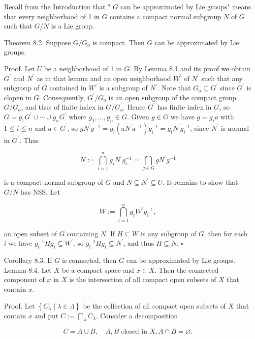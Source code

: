 \documentclass[10pt]{article}
\begin{document}
Recall from the Introduction that " $G$ can be approximated by Lie groups" means that every neighborhood of 1 in $G$ contains a compact normal subgroup $N$ of $G$ such that $G / N$ is a Lie group.

Theorem 8.2. Suppose $G / G_{\mathrm{o}}$ is compact. Then $G$ can be approximated by Lie groups.

Proof. Let $U$ be a neighborhood of 1 in $G$. By Lemma 8.1 and its proof we obtain $G^{\prime}$ and $N^{\prime}$ as in that lemma and an open neighborhood $W^{\prime}$ of $N^{\prime}$ such that any subgroup of $G$ contained in $W^{\prime}$ is a subgroup of $N^{\prime}$. Note that $G_{\mathrm{o}} \subseteq G^{\prime}$ since $G^{\prime}$ is clopen in $G$. Consequently, $G^{\prime} / G_{\mathrm{o}}$ is an open subgroup of the compact group $G / G_{\mathrm{o}}$, and thus of finite index in $G / G_{\mathrm{o}}$. Hence $G^{\prime}$ has finite index in $G$, so $G=g_{1} G^{\prime} \cup \cdots \cup g_{n} G^{\prime}$ where $g_{1}, \ldots, g_{n} \in G$. Given $g \in G$ we have $g=g_{i} a$ with $1 \leq i \leq n$ and $a \in G^{\prime}$, so $g N^{\prime} g^{-1}=g_{i}\left(a N^{\prime} a^{-1}\right) g_{i}^{-1}=g_{i} N^{\prime} g_{i}^{-1}$, since $N^{\prime}$ is normal in $G^{\prime}$. Thus

$$
N:=\bigcap_{i=1}^{n} g_{i} N^{\prime} g_{i}^{-1}=\bigcap_{g \in G} g N^{\prime} g^{-1}
$$

is a compact normal subgroup of $G$ and $N \subseteq N^{\prime} \subseteq U$. It remains to show that $G / N$ has NSS. Let

$$
W:=\bigcap_{i=1}^{n} g_{i} W^{\prime} g_{i}^{-1},
$$

an open subset of $G$ containing $N$. If $H \subseteq W$ is any subgroup of $G$, then for each $i$ we have $g_{i}^{-1} H g_{i} \subseteq W^{\prime}$, so $g_{i}^{-1} H g_{i} \subseteq N^{\prime}$, and thus $H \subseteq N$. \(\square\)

Corollary 8.3. If $G$ is connected, then $G$ can be approximated by Lie groups.\\
Lemma 8.4. Let $X$ be a compact space and $x \in X$. Then the connected component of $x$ in $X$ is the intersection of all compact open subsets of $X$ that contain $x$.

Proof. Let $\left\{C_{\lambda} \mid \lambda \in \Lambda\right\}$ be the collection of all compact open subsets of $X$ that contain $x$ and put $C:=\bigcap_{\lambda} C_{\lambda}$. Consider a decomposition

$$
C=A \cup B, \quad A, B \text { closed in } X, A \cap B=\varnothing .
$$
\end{document}
